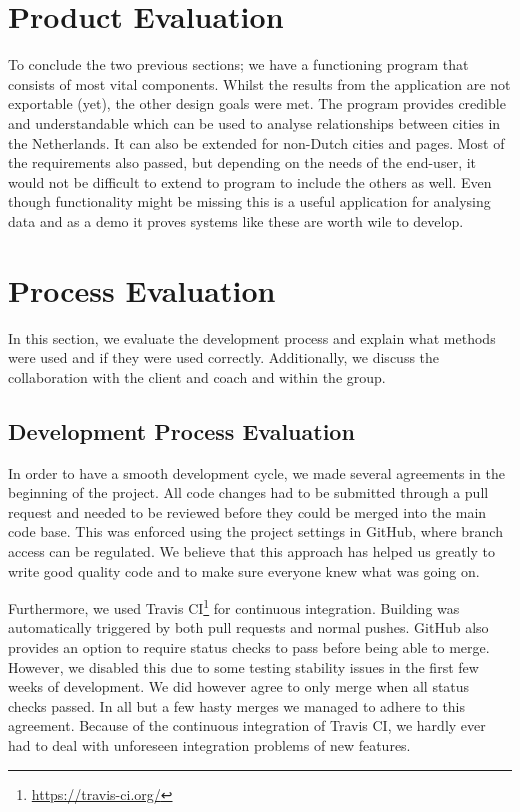 \section{Product Evaluation}
To conclude the two previous sections; we have a functioning program that consists of most vital components. Whilst the results from the application are not exportable (yet), the other design goals were met. The program provides credible and understandable which can be used to analyse relationships between cities in the Netherlands. It can also be extended for non-Dutch cities and pages. Most of the requirements also passed, but depending on the needs of the end-user, it would not be difficult to extend to program to include the others as well. Even though functionality might be missing this is a useful application for analysing data and as a demo it proves systems like these are worth wile to develop.

\section{Process Evaluation}
In this section, we evaluate the development process and explain what methods were used and if they were used correctly. Additionally, we discuss the collaboration with the client and coach and within the group.

\subsection{Development Process Evaluation}
In order to have a smooth development cycle, we made several agreements in the beginning of the project. All code changes had to be submitted through a pull request and needed to be reviewed before they could be merged into the main code base. This was enforced using the project settings in GitHub, where branch access can be regulated. We believe that this approach has helped us greatly to write good quality code and to make sure everyone knew what was going on.

Furthermore, we used Travis CI\footnote{\url{https://travis-ci.org/}} for continuous integration. Building was automatically triggered by both pull requests and normal pushes. GitHub also provides an option to require status checks to pass before being able to merge. However, we disabled this due to some testing stability issues in the first few weeks of development. We did however agree to only merge when all status checks passed. In all but a few hasty merges we managed to adhere to this agreement. Because of the continuous integration of Travis CI, we hardly ever had to deal with unforeseen integration problems of new features.

